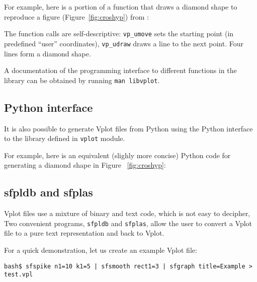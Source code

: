 For example, here is a portion of a function that draws a diamond
shape to reproduce a figure (Figure~\ref{fig:croshyp}) from \cite[]{bei}:

\lstset{language=c,numbers=left,numberstyle=\tiny,showstringspaces=false}


The function calls are self-descriptive: \texttt{vp\_umove} sets the
starting point (in predefined ``user'' coordinates),
\texttt{vp\_udraw} draws a line to the next point. Four lines form a
diamond shape.


A documentation of the programming interface to different functions in
the library can be obtained by running \texttt{man libvplot}.

\subsection{Python interface}

It is also possible to generate Vplot files from Python using the
Python interface to the library defined in \texttt{vplot} module.

For example, here is an equivalent (slighly more concise) Python code
for generating a diamond shape in Figure ~\ref{fig:croshyp}:

\lstset{language=python,numbers=left,numberstyle=\tiny,showstringspaces=false}


\subsection{sfpldb and sfplas}

Vplot files use a mixture of binary and text code, which is not easy
to decipher, Two convenient programs, \texttt{sfpldb} and
\texttt{sfplas}, allow the user to convert a Vplot file to a pure text representation and back to Vplot.

For a quick demonstration, let us create an example Vplot file:
\begin{verbatim}
bash$ sfspike n1=10 k1=5 | sfsmooth rect1=3 | sfgraph title=Example > test.vpl
\end{verbatim}

